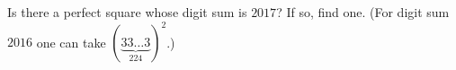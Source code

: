 Is there a perfect square whose digit sum is $2017$? If so, find one. (For digit sum $2016$ one can take $\left(\underbrace{33\ldots3}_{224}\right)^2$.)
